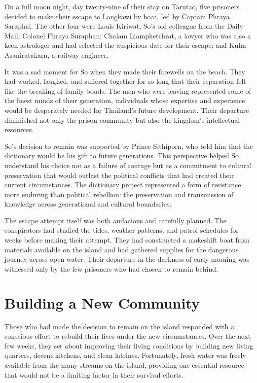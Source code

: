 \documentclass[
  Letterpaper,
]{scrbook}
\begin{document}
On a full moon night, day twenty-nine of their stay on Tarutao, five
prisoners decided to make their escape to Langkawi by boat, led by
Captain Phraya Saraphai. The other four were Louis Kiriwat, So's old
colleague from the Daily Mail; Colonel Phraya Suraphan; Chalam
Liamphetchrat, a lawyer who was also a keen astrologer and had selected
the auspicious date for their escape; and Kuhn Asaniratakarn, a railway
engineer.

It was a sad moment for So when they made their farewells on the beach.
They had worked, laughed, and suffered together for so long that their
separation felt like the breaking of family bonds. The men who were
leaving represented some of the finest minds of their generation,
individuals whose expertise and experience would be desperately needed
for Thailand's future development. Their departure diminished not only
the prison community but also the kingdom's intellectual resources.

So's decision to remain was supported by Prince Sithiporn, who told him
that the dictionary would be his gift to future generations. This
perspective helped So understand his choice not as a failure of courage
but as a commitment to cultural preservation that would outlast the
political conflicts that had created their current circumstances. The
dictionary project represented a form of resistance more enduring than
political rebellion: the preservation and transmission of knowledge
across generational and cultural boundaries.

The escape attempt itself was both audacious and carefully planned. The
conspirators had studied the tides, weather patterns, and patrol
schedules for weeks before making their attempt. They had constructed a
makeshift boat from materials available on the island and had gathered
supplies for the dangerous journey across open water. Their departure in
the darkness of early morning was witnessed only by the few prisoners
who had chosen to remain behind.

\section{Building a New Community}\label{building-a-new-community}

Those who had made the decision to remain on the island responded with a
conscious effort to rebuild their lives under the new circumstances.
Over the next few weeks, they set about improving their living
conditions by building new living quarters, decent kitchens, and clean
latrines. Fortunately, fresh water was freely available from the many
streams on the island, providing one essential resource that would not
be a limiting factor in their survival efforts.
\end{document}
